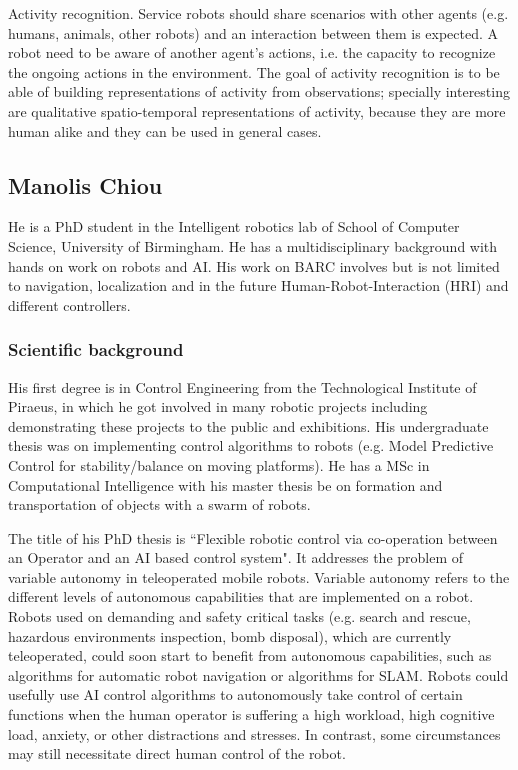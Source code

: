 \documentclass[conference]{IEEEtran}
\begin{document}
Activity recognition. Service robots should share scenarios with other agents (e.g. humans, animals, other robots) and an interaction between them is expected. A robot need to be aware of another agent's actions, i.e. the capacity to recognize the ongoing actions in the environment. The goal of activity recognition is to be able of building representations of activity from observations; specially interesting are qualitative spatio-temporal representations of activity, because they are more human alike and they can be used in general cases.

\subsection{Manolis Chiou}

He is a PhD student in the Intelligent robotics lab of School of Computer Science, University of Birmingham. He has a multidisciplinary background with hands on work on robots and AI. His work on BARC involves but is not limited to navigation, localization and in the future Human-Robot-Interaction (HRI) and different controllers.

\subsubsection*{Scientific background}

His first degree is in Control Engineering from the Technological Institute of Piraeus, in which he got involved in many robotic projects including demonstrating these projects to the public and exhibitions. His undergraduate thesis was on implementing control algorithms to robots (e.g. Model Predictive Control for stability/balance on moving platforms). He has a MSc in Computational Intelligence with his master thesis be on formation and transportation of objects with a swarm of robots.  

The title of his PhD thesis is ``Flexible robotic control via co-operation between an Operator and an AI based control system". It addresses the problem of variable autonomy in teleoperated mobile robots. Variable autonomy refers to the different levels of autonomous capabilities that are implemented on a robot. Robots used on demanding and safety critical tasks (e.g. search and rescue, hazardous environments inspection, bomb disposal), which are currently teleoperated, could soon start to benefit from autonomous capabilities, such as algorithms for automatic robot navigation or algorithms for SLAM. Robots could usefully use AI control algorithms to autonomously take control of certain functions when the human operator is suffering a high workload, high cognitive load, anxiety, or other distractions and stresses. In contrast, some circumstances may still necessitate direct human control of the robot.
\end{document}
